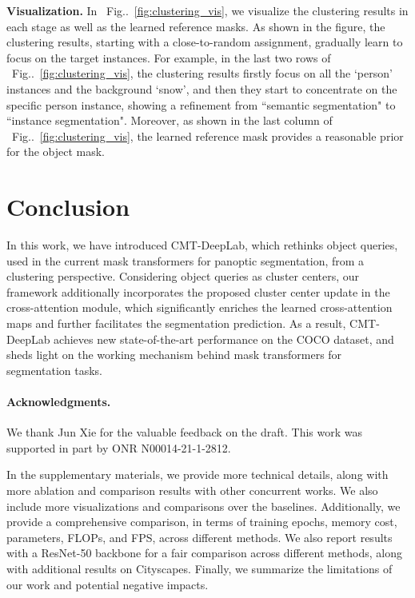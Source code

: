 \documentclass[10pt,twocolumn,letterpaper]{article}
\makeatletter
\DeclareRobustCommand\onedot{\futurelet\@let@token\@onedot}
\def\@onedot{\ifx\@let@token.\else.\null\fi\xspace}
\newcommand{\figref}[1]{Fig\onedot~\ref{#1}}
\makeatother
\begin{document}
\vspace{0.5ex}
\noindent\textbf{Visualization.} In ~\figref{fig:clustering_vis}, we visualize  the clustering results in each stage as well as the learned reference masks.
As shown in the figure, the clustering results, starting with a close-to-random assignment, gradually learn to focus on the target instances. 
For example, in the last two rows of ~\figref{fig:clustering_vis}, the clustering results firstly focus on all the `person' instances and the background `snow', and then they start to concentrate on the specific person instance, showing a refinement from ``semantic segmentation" to ``instance segmentation".
Moreover, as shown in the last column of ~\figref{fig:clustering_vis}, the learned reference mask provides a reasonable prior for the object mask. 

\label{sec:experiments} \vspace{-1ex}
\section{Conclusion}
\label{sec:conclusion}

In this work, we have introduced CMT-DeepLab, which rethinks object queries, used in the current mask transformers for panoptic segmentation, from a clustering perspective. Considering object queries as cluster centers, our framework additionally incorporates the proposed cluster center update in the cross-attention module, which significantly enriches the learned cross-attention maps and further facilitates the segmentation prediction. 
As a result, CMT-DeepLab achieves new state-of-the-art performance on the COCO dataset, and sheds light on the working mechanism behind mask transformers for segmentation tasks.

\paragraph{Acknowledgments.}
We thank Jun Xie for the valuable feedback on the draft. This work was supported in part by ONR N00014-21-1-2812. 

\clearpage
{\small


}
\clearpage


In the supplementary materials, we provide more technical details, along with more ablation and comparison results with other concurrent works. We also include more visualizations and comparisons over the baselines. Additionally, we provide a comprehensive comparison, in terms of training epochs, memory cost, parameters, FLOPs, and FPS, across different methods. We also report results with a ResNet-50 backbone for a fair comparison across different methods, along with additional results on Cityscapes. Finally, we summarize the limitations of our work and potential negative impacts.
\end{document}
